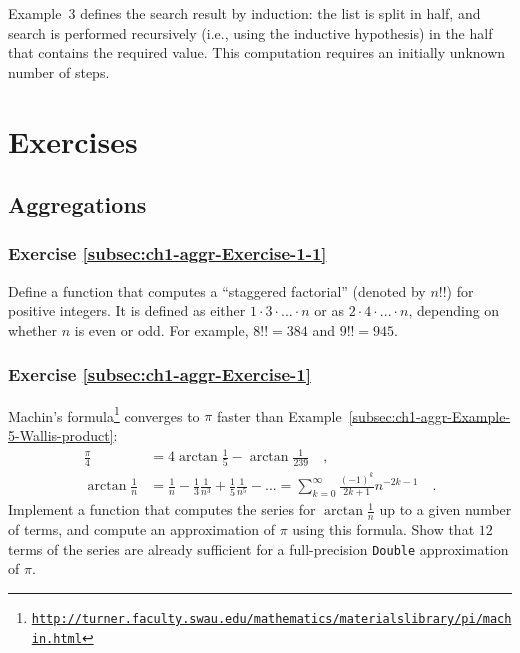 Example\ 3 defines the search result by induction: the list is split
in half, and search is performed recursively (i.e., using the inductive
hypothesis) in the half that contains the required value. This computation
requires an initially unknown number of steps.

\section{Exercises\label{sec:beginner-Exercises}}

\subsection{Aggregations}

\subsubsection{Exercise \label{subsec:ch1-aggr-Exercise-1-1}\ref{subsec:ch1-aggr-Exercise-1-1}}

Define a function that computes a \textsf{``}staggered factorial\textsf{''}
(denoted by $n!!$) for positive integers. It is defined as either
$1\cdot3\cdot...\cdot n$ or as $2\cdot4\cdot...\cdot n$, depending
on whether $n$ is even or odd. For example, $8!!=384$ and $9!!=945$.

\subsubsection{Exercise \label{subsec:ch1-aggr-Exercise-1}\ref{subsec:ch1-aggr-Exercise-1}}

Machin\textsf{'}s formula\footnote{\texttt{\href{http://turner.faculty.swau.edu/mathematics/materialslibrary/pi/machin.html}{http://turner.faculty.swau.edu/mathematics/materialslibrary/pi/machin.html}}}
converges to $\pi$ faster than Example~\ref{subsec:ch1-aggr-Example-5-Wallis-product}:
\begin{align*}
\frac{\pi}{4} & =4\arctan\frac{1}{5}-\arctan\frac{1}{239}\quad,\\
\arctan\frac{1}{n} & =\frac{1}{n}-\frac{1}{3}\frac{1}{n^{3}}+\frac{1}{5}\frac{1}{n^{5}}-...=\sum_{k=0}^{\infty}\frac{\left(-1\right)^{k}}{2k+1}n^{-2k-1}\quad.
\end{align*}
Implement a function that computes the series for $\arctan\frac{1}{n}$
up to a given number of terms, and compute an approximation of $\pi$
using this formula. Show that $12$ terms of the series are already
sufficient for a full-precision \lstinline!Double! approximation
of $\pi$.


